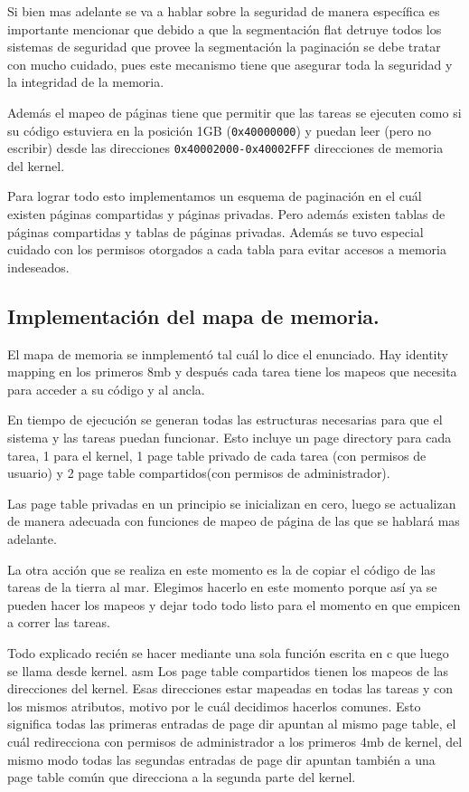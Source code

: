 	Si bien mas adelante se va a hablar sobre la seguridad
de manera específica es importante mencionar que debido a que la
segmentación flat detruye todos los sistemas de seguridad que provee
la segmentación la paginación se debe tratar con mucho cuidado, pues
este mecanismo tiene que asegurar toda la seguridad y la integridad de la memoria.

	Además el mapeo de páginas tiene que permitir que las tareas
se ejecuten como si su código estuviera en la posición 1GB (\texttt{0x40000000})
y puedan leer (pero no escribir) desde las direcciones \texttt{0x40002000-0x40002FFF}
direcciones de memoria del kernel.

	Para lograr todo esto implementamos un esquema de paginación en el cuál
existen páginas compartidas y páginas privadas. Pero además existen tablas
de páginas compartidas y tablas de páginas privadas. Además se tuvo especial
cuidado con los permisos otorgados a cada tabla para evitar accesos a memoria
indeseados.

\subsection{Implementación del mapa de memoria.}
	El mapa de memoria se inmplementó tal cuál lo dice el enunciado. Hay
identity mapping en los primeros 8mb y después cada tarea tiene
los mapeos que necesita para acceder a su código y al ancla.
	
	En tiempo de ejecución se generan todas las estructuras necesarias
para que el sistema y las tareas puedan funcionar. Esto incluye un page directory para cada
tarea, 1 para el kernel, 1 page table privado de cada tarea (con
permisos de usuario) y 2 page table compartidos(con permisos de administrador).

	Las page table privadas en un principio se inicializan en cero, luego
se actualizan de manera adecuada con funciones de mapeo de página
de las que se hablará mas adelante.

	La otra acción que se realiza en este momento es la de
copiar el código de las tareas de la tierra al mar. Elegimos hacerlo
en este momento porque así ya se pueden hacer los mapeos y dejar
todo todo listo para el momento en que empicen a correr las tareas.

	Todo explicado recién se hacer mediante una sola función escrita en c
que luego se llama desde kernel. asm
\newpage
	Los page table compartidos tienen los mapeos de las direcciones del kernel.
Esas direcciones estar mapeadas en todas las tareas y con los mismos atributos, motivo
por le cuál decidimos hacerlos comunes. Esto significa todas las primeras entradas
de page dir apuntan al mismo page table, el cuál redirecciona con permisos de administrador
a los primeros 4mb de kernel, del mismo modo todas las segundas entradas
de page dir apuntan también a una page table común que direcciona
a la segunda parte del kernel.


